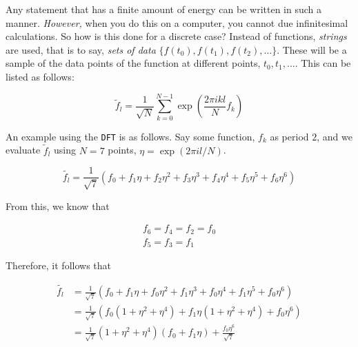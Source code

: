 \documentclass[reprint, amsmath,amssymb, aps]{revtex4-2}
\begin{document}
                Any statement that has a finite amount of energy can be written in such a manner. \textit{However,} when you do this on a computer, you cannot due infinitesimal calculations. So how is this done for a discrete case? Instead of functions, \textit{strings} are used, that is to say, \textit{sets of data} $\{f(t_0), f(t_1), f(t_2),\dots\}$. These will be a sample of the data points of the function at different points, $t_0, t_1, \dots$. This can be listed as follows:

                \begin{equation*}
                    \tilde{f}_{l} = \frac{1}{\sqrt{N}} \sum_{k=0}^{N-1}\exp(\frac{2\pi i k l}{N}f_k)
                \end{equation*}

                An example using the \texttt{DFT} is as follows. Say some function, $f_k$ as period $2$, and we evaluate $\tilde{f}_l$ using $N=7$ points, $\eta = \exp(2\pi i l / N)$.

                \begin{equation*}
                    \tilde{f_l} = \frac{1}{\sqrt{7}} (f_0 + f_1 \eta + f_2 \eta^2 + f_3 \eta^3 + f_4 \eta^4 + f_5 \eta^5 + f_6 \eta^6)
                \end{equation*}

                From this, we know that

                \begin{gather*}
                    f_6 = f_4  = f_2 = f_0 \\
                    f_5 = f_3 = f_1
                \end{gather*}

                Therefore, it follows that

                \begin{align*}
                \tilde{f_l} &= \frac{1}{\sqrt{7}} (f_0 + f_1 \eta + f_0 \eta^2 + f_1 \eta^3 + f_0 \eta^4 + f_1 \eta^5 + f_0 \eta^6) \\
                &= \frac{1}{\sqrt{7}}(f_0(1+\eta^2 + \eta^4) + f_1\eta(1+\eta^2 + \eta^4) + f_0\eta^6)\\
                &= \frac{1}{\sqrt{7}}(1+\eta^2 + \eta^4)(f_0 + f_1\eta) + \frac{f_0\eta^6}{\sqrt{7}}
                \end{align*}
\end{document}
